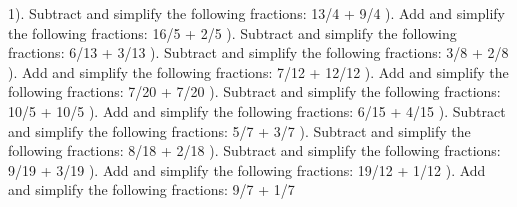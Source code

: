 \documentclass{article}%
\begin{document}
1). Subtract and simplify the following fractions: 13/4 + 9/4%
\newline%
\newline%
). Add and simplify the following fractions: 16/5 + 2/5%
\newline%
\newline%
). Subtract and simplify the following fractions: 6/13 + 3/13%
\newline%
\newline%
). Subtract and simplify the following fractions: 3/8 + 2/8%
\newline%
\newline%
). Add and simplify the following fractions: 7/12 + 12/12%
\newline%
\newline%
). Add and simplify the following fractions: 7/20 + 7/20%
\newline%
\newline%
). Subtract and simplify the following fractions: 10/5 + 10/5%
\newline%
\newline%
). Add and simplify the following fractions: 6/15 + 4/15%
\newline%
\newline%
). Subtract and simplify the following fractions: 5/7 + 3/7%
\newline%
\newline%
). Subtract and simplify the following fractions: 8/18 + 2/18%
\newline%
\newline%
). Subtract and simplify the following fractions: 9/19 + 3/19%
\newline%
\newline%
). Add and simplify the following fractions: 19/12 + 1/12%
\newline%
\newline%
). Add and simplify the following fractions: 9/7 + 1/7%
\end{document}

